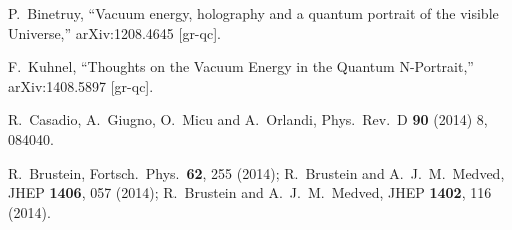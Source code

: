 \documentclass[aps, prd, preprint, superscriptaddress, tightenlines, nofootinbib]{revtex4}
\begin{document}
\begin{thebibliography}{99}
	P.~Binetruy,
	``Vacuum energy, holography and a quantum portrait of the visible Universe,''
	arXiv:1208.4645 [gr-qc].

	F.~Kuhnel,
	``Thoughts on the Vacuum Energy in the Quantum N-Portrait,''
	arXiv:1408.5897 [gr-qc].

	R.~Casadio, A.~Giugno, O.~Micu and A.~Orlandi,
	Phys.~Rev.~D {\bf 90} (2014) 8, 084040.

	R.~Brustein,
	Fortsch.~Phys.~{\bf 62}, 255 (2014);
	R.~Brustein and A.~J.~M.~Medved,
	JHEP {\bf 1406}, 057 (2014);
	R.~Brustein and A.~J.~M.~Medved,
	JHEP {\bf 1402}, 116 (2014).


\end{thebibliography}
\end{document}
